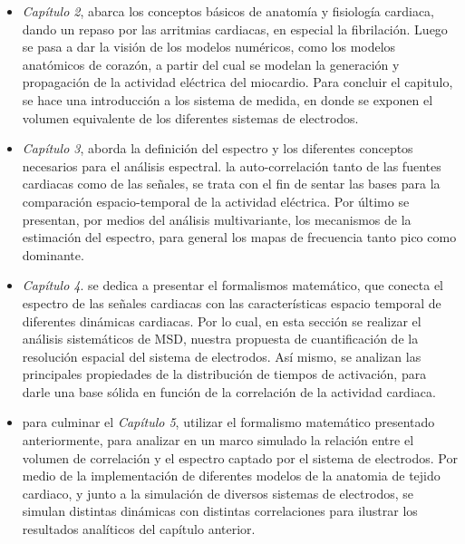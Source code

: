 \begin{itemize}
  \item \textit{Capítulo 2}, abarca los conceptos básicos de anatomía  y
  fisiología cardiaca, dando un repaso por las arritmias cardiacas, en especial
  la fibrilación. Luego se pasa a dar la visión de los modelos numéricos, como
  los modelos anatómicos de corazón, a partir del cual se modelan la
  generación y propagación de la actividad eléctrica del miocardio. Para concluir
  el capitulo, se hace una introducción a los sistema de medida, en donde se
  exponen el volumen equivalente de los diferentes sistemas de electrodos.

  \item \textit{Capítulo 3}, aborda la definición del espectro  y los diferentes
  conceptos necesarios para el análisis espectral. la auto-correlación tanto de
  las fuentes cardiacas como de las señales, se trata con el fin de  sentar las
  bases para la comparación espacio-temporal de la actividad eléctrica. Por
  último se presentan, por medios del análisis multivariante, los mecanismos de
  la estimación del espectro, para  general los mapas de frecuencia tanto pico
  como dominante.

  \item \textit{Capítulo 4}. se dedica a presentar el formalismos matemático,
  que conecta el espectro de las señales cardiacas con las características
  espacio temporal de diferentes dinámicas cardiacas. Por lo cual, en esta
  sección se realizar el análisis sistemáticos de \ac{MSD}, nuestra propuesta de
  cuantificación de la resolución espacial del sistema de electrodos. Así mismo,
  se analizan las principales propiedades de la distribución de tiempos de
  activación, para darle una base sólida en función de la correlación de la
  actividad cardiaca.

  \item para culminar  el \textit{Capítulo 5}, utilizar el formalismo matemático
  presentado anteriormente, para analizar en un marco simulado la relación entre
  el volumen de correlación y el espectro captado por el sistema de electrodos.
  Por medio de la implementación de diferentes modelos de la anatomia de tejido
  cardiaco, y junto a la simulación de diversos sistemas de electrodos, se
  simulan distintas dinámicas con distintas correlaciones  para ilustrar los
  resultados analíticos del capítulo anterior.

  \end{itemize}
